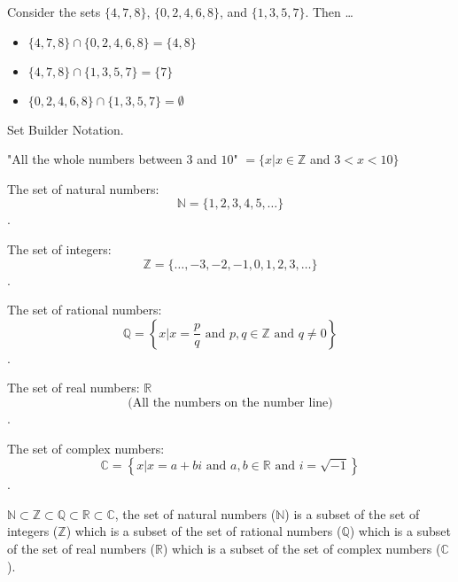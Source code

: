 \begin{example}
  \label{exm:intersection}

  Consider the sets $\{ 4, 7, 8 \}$, $\{ 0, 2, 4, 6, 8 \}$, and
  $\{ 1, 3, 5, 7 \}$. Then \ldots

  \begin{itemize}
    \label{item:intersection_1}
  
    \item $\{ 4, 7, 8 \} \cap \{ 0, 2, 4, 6, 8 \} = \{ 4, 8 \}$
    \item $\{ 4, 7, 8 \} \cap \{ 1, 3, 5, 7\} = \{ 7 \}$ 
    \item $\{ 0, 2, 4, 6, 8 \} \cap \{ 1, 3, 5, 7 \} = \emptyset$
  \end{itemize}
\end{example}

\begin{notation}
  Set Builder Notation.

  "All the whole numbers between $3$ and $10$" $= \{ x | x \in \mathbb{Z}$ and
  $3 < x < 10 \}$
\end{notation}

\begin{definition}
  \label{def:important_sets_of_numbers}

  The set of natural numbers:
  \[ \mathbb{N} = \{ 1, 2, 3, 4, 5, \ldots \} \].

  The set of integers:
  \[ \mathbb{Z} = \{ \ldots, -3, -2, -1, 0, 1, 2, 3, \ldots \} \].

  The set of rational numbers:
  \[ \mathbb{Q} = \left\{x | x = \frac{p}{q} \textrm{ and } p, q \in \mathbb{Z}
    \textrm{ and } q \ne 0 \right\} \].

  The set of real numbers: $\mathbb{R}$
  \[ \textrm{(All the numbers on the number line)} \].

  The set of complex numbers:
  \[ \mathbb{C} = \left\{x | x = a + bi \textrm{ and } a, b \in \mathbb{R}
    \textrm{ and } i = \sqrt{-1}\right\} \].
\end{definition}

\begin{note}
  $\mathbb{N} \subset \mathbb{Z} \subset \mathbb{Q} \subset \mathbb{R} \subset
  \mathbb{C}$, the set of natural numbers ($\mathbb{N}$) is a subset of the set
  of integers ($\mathbb{Z}$) which is a subset of the set of rational numbers
  ($\mathbb{Q}$) which is a subset of the set of real numbers ($\mathbb{R}$)
  which is a subset of the set of complex numbers ($\mathbb{C}$).
\end{note}

